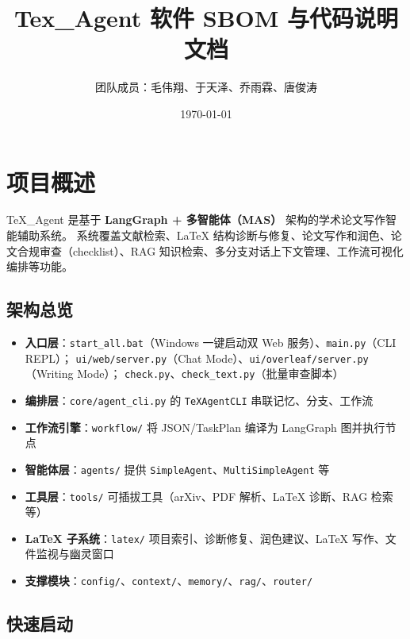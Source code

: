 \documentclass[12pt,a4paper]{ctexart}
\title{Tex\_Agent 软件 SBOM 与代码说明文档}
\author{团队成员：毛伟翔、于天泽、乔雨霖、唐俊涛}
\date{\today}
\begin{document}
\maketitle
\begingroup
\hypersetup{linkcolor=black}
\tableofcontents
\endgroup
\newpage




\section{项目概述}

TeX\_Agent 是基于 \textbf{LangGraph + 多智能体（MAS）} 架构的学术论文写作智能辅助系统。
系统覆盖文献检索、LaTeX 结构诊断与修复、论文写作和润色、论文合规审查（checklist）、RAG 知识检索、多分支对话上下文管理、工作流可视化编排等功能。

\subsection{架构总览}

\begin{itemize}[leftmargin=2em]
    \item \textbf{入口层}：\texttt{start\_all.bat}（Windows 一键启动双 Web 服务）、\texttt{main.py}（CLI REPL）；\newline
          \texttt{ui/web/server.py}（Chat Mode）、\texttt{ui/overleaf/server.py}（Writing Mode）；\newline
          \texttt{check.py}、\texttt{check\_text.py}（批量审查脚本）
    \item \textbf{编排层}：\texttt{core/agent\_cli.py} 的 \texttt{TeXAgentCLI} 串联记忆、分支、工作流
    \item \textbf{工作流引擎}：\texttt{workflow/} 将 JSON/TaskPlan 编译为 LangGraph 图并执行节点
    \item \textbf{智能体层}：\texttt{agents/} 提供 \texttt{SimpleAgent}、\texttt{MultiSimpleAgent} 等
    \item \textbf{工具层}：\texttt{tools/} 可插拔工具（arXiv、PDF 解析、LaTeX 诊断、RAG 检索等）
    \item \textbf{LaTeX 子系统}：\texttt{latex/} 项目索引、诊断修复、润色建议、LaTeX 写作、文件监视与幽灵窗口
    \item \textbf{支撑模块}：\texttt{config/}、\texttt{context/}、\texttt{memory/}、\texttt{rag/}、\texttt{router/}
\end{itemize}

\subsection{快速启动}
\end{document}
